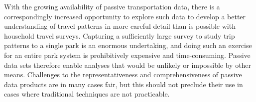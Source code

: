\documentclass[]{elsarticle} %
\begin{document}
With the growing availability of passive transportation data, there is a
correspondingly increased opportunity to explore such data to develop a better
understanding of travel patterns in more careful detail than is possible with
household travel surveys. Capturing a sufficiently large survey to study trip
patterns to a single park is an enormous undertaking, and doing such an exercise
for an entire park system is prohibitively expensive and time-consuming. Passive
data sets therefore enable analyses that would be unlikely or impossible by
other means. Challenges to the representativeness and comprehensiveness of
passive data products are in many cases fair, but this should not preclude their
use in cases where traditional techniques are not practicable.


\end{document}
